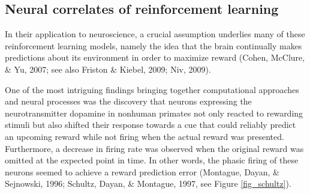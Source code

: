 \documentclass[12pt,openany]{book}
\theoremstyle{definition}
\theoremstyle{definition}
\theoremstyle{definition}
\theoremstyle{remark}
\begin{document}
\subsection{Neural correlates of reinforcement
learning}\label{neural-correlates-of-reinforcement-learning}

In their application to neuroscience, a crucial assumption underlies
many of these reinforcement learning models, namely the idea that the
brain continually makes predictions about its environment in order to
maximize reward (Cohen, McClure, \& Yu, 2007; see also Friston \&
Kiebel, 2009; Niv, 2009).

One of the most intriguing findings bringing together computational
approaches and neural processes was the discovery that neurons
expressing the neurotransmitter dopamine in nonhuman primates not only
reacted to rewarding stimuli but also shifted their response towards a
cue that could reliably predict an upcoming reward while not firing when
the actual reward was presented. Furthermore, a decrease in firing rate
was observed when the original reward was omitted at the expected point
in time. In other words, the phasic firing of these neurons seemed to
achieve a reward prediction error (Montague, Dayan, \& Sejnowski, 1996;
Schultz, Dayan, \& Montague, 1997, see Figure \ref{fig_schultz}).
\end{document}

